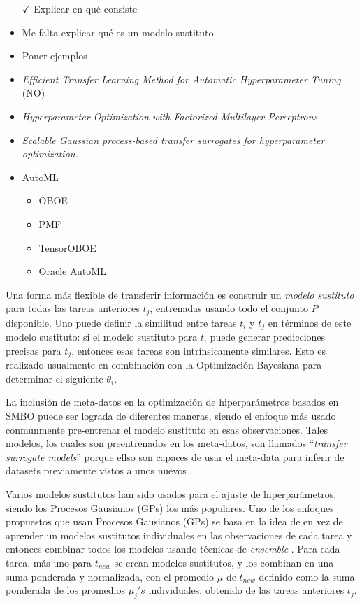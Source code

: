 \begin{itemize}
	\item[$\checkmark$] Explicar en qué consiste
	\item Me falta explicar qué es un modelo sustituto
	\item Poner ejemplos
	\item \textit{Efficient Transfer Learning Method for Automatic Hyperparameter Tuning} \cite{yogatama2014efficient} (NO)
	\item \textit{Hyperparameter Optimization with Factorized Multilayer Perceptrons} \cite{schilling2015hyp}
	\item \textit{Scalable Gaussian process-based transfer surrogates for hyperparameter optimization.} \cite{witsuba2018scalable}
	\item AutoML \begin{itemize}
		\item OBOE
		\item PMF
		\item TensorOBOE
		\item Oracle AutoML
	\end{itemize}
\end{itemize}

\quad

Una forma más flexible de transferir información es construir un \textit{modelo sustituto} para todas las tareas anteriores $t_j$, entrenadas usando todo el conjunto $P$ disponible. Uno puede definir la similitud entre tareas $t_i$ y $t_j$ en términos de este modelo sustituto: si el modelo sustituto para $t_i$ puede generar predicciones precisas para $t_{j}$, entonces esas tareas son intrínsicamente similares. Esto es realizado usualmente en combinación con la Optimización Bayesiana para determinar el siguiente $\theta_i$. 

La inclusión de meta-datos en la optimización de hiperparámetros basados en SMBO puede ser lograda de diferentes maneras, siendo el enfoque más usado conmunmente pre-entrenar el modelo sustituto en esas observaciones. Tales modelos, los cuales son preentrenados en los meta-datos, son llamados ``\textit{transfer surrogate models}'' porque ellso son capaces de usar el meta-data para inferir de datasets previamente vistos a unos nuevos \cite{witsuba2018scalable}.

Varios modelos sustitutos han sido usados para el ajuste de hiperparámetros, siendo los Procesos Gausianos (GPs) los más populares. Uno de los enfoques propuestos que usan Procesos Gausianos (GPs) se basa en la idea de en vez de aprender un modelos sustitutos individuales en las observaciones de cada tarea y entonces combinar todos los modelos usando técnicas de \textit{ensemble} \cite{witsuba2015learning, witsuba2018scalable}. Para cada tarea, más uno para $t_{new}$ se crean modelos sustitutos, y los combinan en una suma ponderada y normalizada, con el promedio $\mu$ de $t_{new}$ definido como la suma ponderada de los promedios $\mu_j's$ individuales, obtenido de las tareas anteriores $t_j$. 

